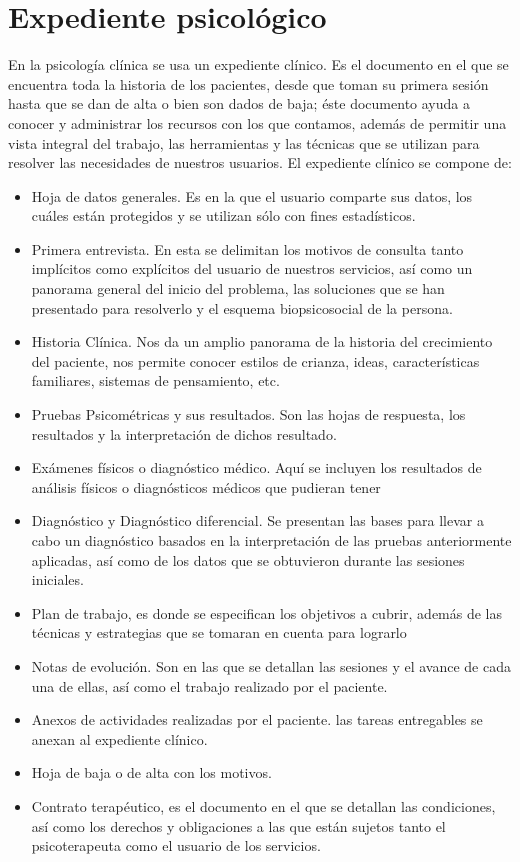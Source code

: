 \section{Expediente psicológico}

En la psicología clínica se usa un expediente clínico. Es el documento en el que se encuentra toda la historia de los pacientes, desde
que toman su primera sesión hasta que se dan de alta o bien son dados de baja; éste documento ayuda a
conocer y administrar los recursos con los que contamos, además de permitir una vista integral del trabajo, las
herramientas y las técnicas que se utilizan para resolver las necesidades de nuestros usuarios.
\newline
\newline
El expediente clínico se compone de:

\begin{itemize}
\item Hoja de datos generales. Es en la que el usuario comparte sus datos, los cuáles están protegidos y se
utilizan sólo con fines estadísticos.
\item Primera entrevista. En esta se delimitan los motivos de consulta tanto implícitos como explícitos del
usuario de nuestros servicios, así como un panorama general del inicio del problema, las soluciones
que se han presentado para resolverlo y el esquema biopsicosocial de la persona.
\item Historia Clínica. Nos da un amplio panorama de la historia del crecimiento del paciente, nos permite
conocer estilos de crianza, ideas, características familiares, sistemas de pensamiento, etc.
\item Pruebas Psicométricas y sus resultados. Son las hojas de respuesta, los resultados y la interpretación
de dichos resultado.
\item Exámenes físicos o diagnóstico médico. Aquí se incluyen los resultados de análisis físicos o
diagnósticos médicos que pudieran tener
\item Diagnóstico y Diagnóstico diferencial. Se presentan las bases para llevar a cabo un diagnóstico
basados en la interpretación de las pruebas anteriormente aplicadas, así como de los datos que se
obtuvieron durante las sesiones iniciales.
\item Plan de trabajo, es donde se especifican los objetivos a cubrir, además de las técnicas y estrategias que
se tomaran en cuenta para lograrlo
\item Notas de evolución. Son en las que se detallan las sesiones y el avance de cada una de ellas, así como
el trabajo realizado por el paciente.
\item Anexos de actividades realizadas por el paciente. las tareas entregables se anexan al expediente
clínico.
\item Hoja de baja o de alta con los motivos.
\item Contrato terapéutico, es el documento en el que se detallan las condiciones, así como los derechos y
obligaciones a las que están sujetos tanto el psicoterapeuta como el usuario de los servicios. \cite{expedientepsicologico}
\end{itemize}
